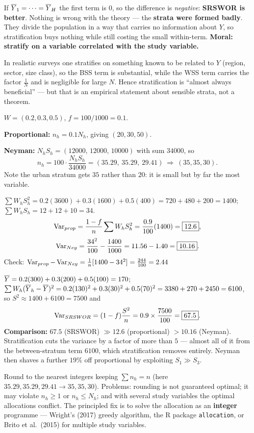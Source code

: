  If $\overline{Y}_1=\cdots=\overline{Y}_H$ the first term is $0$, so the difference is \emph{negative}:
\textbf{SRSWOR is better}. Nothing is wrong with the theory --- the \textbf{strata were formed
badly}. They divide the population in a way that carries no information about $Y$, so
stratification buys nothing while still costing the small within-term. \textbf{Moral: stratify on
a variable correlated with the study variable.}

 In realistic surveys one stratifies on something known to be related to $Y$ (region,
sector, size class), so the BSS term is substantial, while the WSS term carries the factor
$\frac1N$ and is negligible for large $N$. Hence stratification is ``almost always beneficial'' ---
but that is an empirical statement about sensible strata, not a theorem.

\sol $W=(0.2,0.3,0.5)$, $f=100/1000=0.1$.

 \textbf{Proportional:} $n_h=0.1N_h$, giving $\boxed{(20,30,50)}$.

\textbf{Neyman:} $N_hS_h=(12000,\,12000,\,10000)$ with sum $34000$, so
\[
  n_h=100\cdot\frac{N_hS_h}{34000}=(35.29,\ 35.29,\ 29.41)\ \Longrightarrow\ \boxed{(35,35,30)} .
\]
Note the urban stratum gets $35$ rather than $20$: it is small but by far the most variable.

 $\sum W_hS_h^2=0.2(3600)+0.3(1600)+0.5(400)=720+480+200=1400$;
$\sum W_hS_h=12+12+10=34$.
\[
  \operatorname{Var}_{prop}=\frac{1-f}{n}\sum W_hS_h^2=\frac{0.9}{100}(1400)=\boxed{12.6},
\]
\[
  \operatorname{Var}_{Ney}=\frac{34^2}{100}-\frac{1400}{1000}=11.56-1.40=\boxed{10.16}.
\]
Check: $\operatorname{Var}_{prop}-\operatorname{Var}_{Ney}=\frac1n[1400-34^2]=\frac{244}{100}=2.44$ \checkmark

 $\overline{Y}=0.2(300)+0.3(200)+0.5(100)=170$;
$\sum W_h(\overline{Y}_h-\overline{Y})^2=0.2(130)^2+0.3(30)^2+0.5(70)^2=3380+270+2450=6100$, so
$S^2\approx1400+6100=7500$ and
\[
  \operatorname{Var}_{SRSWOR}=(1-f)\frac{S^2}{n}=0.9\times\frac{7500}{100}=\boxed{67.5}.
\]
\textbf{Comparison:} $67.5$ (SRSWOR) $\gg 12.6$ (proportional) $>10.16$ (Neyman). Stratification
cuts the variance by a factor of more than $5$ --- almost all of it from the between-stratum term
$6100$, which stratification removes entirely. Neyman then shaves a further $19\%$ off
proportional by exploiting $S_1\gg S_3$.

 Round to the nearest integers keeping $\sum n_h=n$ (here $35.29,35.29,29.41\to35,35,30$).
Problems: rounding is not guaranteed optimal; it may violate $n_h\ge1$ or $n_h\le N_h$; and with
several study variables the optimal allocations conflict. The principled fix is to solve the
allocation as an \textbf{integer} programme --- Wright's (2017) greedy algorithm, the R package
\texttt{allocation}, or Brito et al.\ (2015) for multiple study variables.

